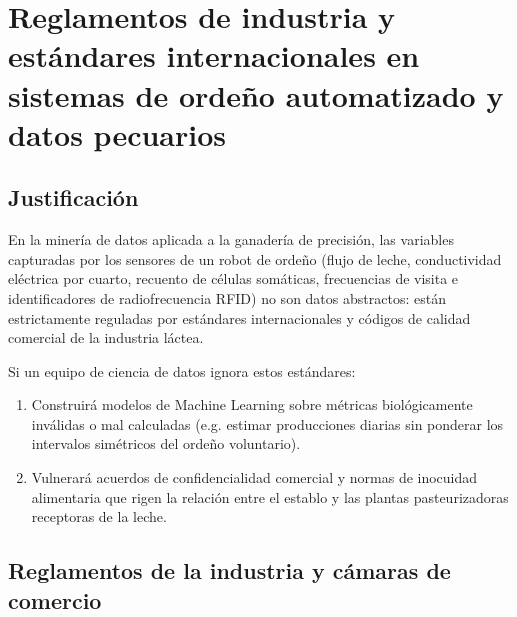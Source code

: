 \section{Reglamentos de industria y estándares internacionales en sistemas de ordeño automatizado y datos pecuarios}

\subsection{Justificación}

En la minería de datos aplicada a la ganadería de precisión, las variables capturadas por los sensores de un robot de ordeño (flujo de leche, conductividad eléctrica por cuarto, recuento de células somáticas, frecuencias de visita e identificadores de radiofrecuencia RFID) no son datos abstractos: están estrictamente reguladas por estándares internacionales y códigos de calidad comercial de la industria láctea.

Si un equipo de ciencia de datos ignora estos estándares:

\begin{enumerate}
  \item Construirá modelos de Machine Learning sobre métricas biológicamente inválidas o mal calculadas (e.g. estimar producciones diarias sin ponderar los intervalos simétricos del ordeño voluntario).
  \item Vulnerará acuerdos de confidencialidad comercial y normas de inocuidad alimentaria que rigen la relación entre el establo y las plantas pasteurizadoras receptoras de la leche.
\end{enumerate}

\subsection{Reglamentos de la industria y cámaras de comercio}

